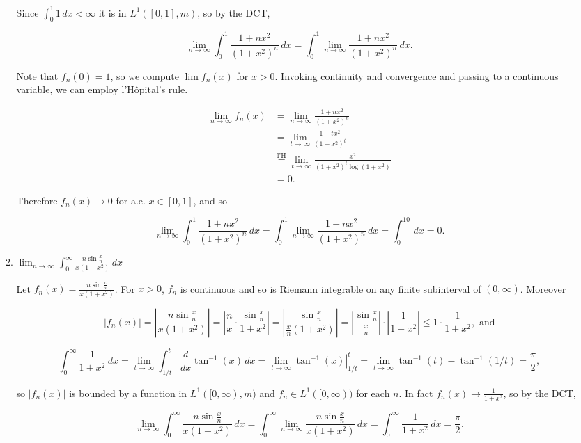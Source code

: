 \documentclass[11pt,oneside,english]{amsart}
\theoremstyle{definition}
\newcommand{\lom}[2]{\lim_{{#1}\rightarrow{#2}}}
\newcommand{\dd}[2]{\frac{d{#1}}{d{#2}}}
\begin{document}
\begin{enumerate}
\begin{enumerate}
Since $\int_0^1 1\,dx<\infty$ it is in $L^1([0,1],m)$, so by the DCT, 

\[
\lom{n}{\infty}\int_0^1\frac{1+nx^2}{(1+x^2)^n}\,dx=\int_0^1 \lom{n}{\infty}\frac{1+nx^2}{(1+x^2)^n}\,dx.
\]

Note that $f_n(0)=1$, so we compute $\lim f_n(x)$ for $x>0$. Invoking continuity and convergence and passing to a continuous variable, we can employ l'H\^{o}pital's rule.

\begin{align*}
\lom{n}{\infty}f_n(x)&=\lom{n}{\infty}\frac{1+nx^2}{(1+x^2)^n}\\[2mm]
&=\lom{t}{\infty}\frac{1+tx^2}{(1+x^2)^t}\\[2mm]
&\stackrel{\text{l'H}}{=}\lom{t}{\infty}\frac{x^2}{(1+x^2)^t\log (1+x^2)}\\[2mm]
&=0.
\end{align*}

Therefore $f_n(x)\rightarrow 0$ for a.e. $x\in[0,1]$, and so 

\[
\lom{n}{\infty}\int_0^1\frac{1+nx^2}{(1+x^2)^n}\,dx=\int_0^1\lom{n}{\infty}\frac{1+nx^2}{(1+x^2)^n}\,dx=\int_0^10\,dx=0.
\]



\item $\displaystyle \lom{n}{\infty}\int_0^\infty \frac{n\sin\frac{x}{n}}{x(1+x^2)}\,dx$

Let $f_n(x)=\frac{n\sin\frac{x}{n}}{x(1+x^2)}$. For $x>0$, $f_n$ is continuous and so is Riemann integrable on any finite subinterval of $(0,\infty)$. Moreover

\[
|f_n(x)|=\left|\frac{n\sin\frac{x}{n}}{x(1+x^2)}\right|=\left|\frac{n}{x}\cdot\frac{\sin\frac{x}{n}}{1+x^2}\right|= \left|\frac{\sin\frac{x}{n}}{\frac{x}{n}(1+x^2)}\right|=\left|\frac{\sin\frac{x}{n}}{\frac{x}{n}}\right|\cdot\left|\frac{1}{1+x^2}\right|\leq1\cdot\frac{1}{1+x^2},\text{ and}
\]

\[
\int_0^\infty \frac{1}{1+x^2}\,dx=\lom{t}{\infty}\int_{1/t}^t\dd{}{x}\tan^{-1}(x)\,dx=\lom{t}{\infty}\left.\tan^{-1}(x)\right|_{1/t}^t=\lom{t}{\infty}\tan^{-1}(t)-\tan^{-1}(1/t)=\frac{\pi}{2},
\]

so $|f_n(x)|$ is bounded by a function in $L^1([0,\infty),m)$ and $f_n\in L^1([0,\infty))$ for each $n$.  In fact $f_n(x)\rightarrow\frac{1}{1+x^2}$, so by the DCT,

\[
\lom{n}{\infty}\int_0^\infty \frac{n\sin\frac{x}{n}}{x(1+x^2)}\,dx=\int_0^\infty \lom{n}{\infty}\frac{n\sin\frac{x}{n}}{x(1+x^2)}\,dx=\int_0^\infty\frac{1}{1+x^2}\,dx= \frac{\pi}{2}.
\]


\end{enumerate}
\end{enumerate}
\end{document}
